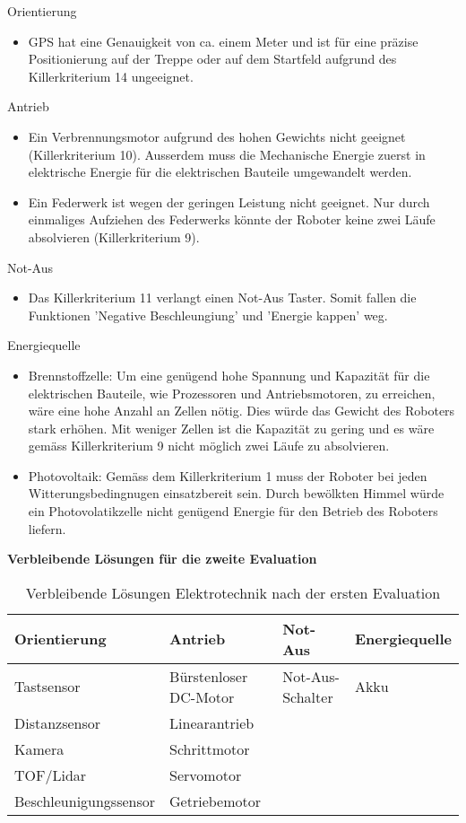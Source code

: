 Orientierung
\begin{itemize}
    \item GPS hat eine Genauigkeit von ca. einem Meter und ist für eine präzise Positionierung auf der Treppe oder auf dem Startfeld aufgrund des Killerkriterium 14 ungeeignet.
\end{itemize}
Antrieb
\begin{itemize}
    \item Ein Verbrennungsmotor aufgrund des hohen Gewichts nicht geeignet (Killerkriterium 10). Ausserdem muss die Mechanische Energie zuerst in elektrische Energie für die elektrischen Bauteile umgewandelt werden.
    \item Ein Federwerk ist wegen der geringen Leistung nicht geeignet. Nur durch einmaliges Aufziehen des Federwerks könnte der Roboter keine zwei Läufe absolvieren (Killerkriterium 9).
\end{itemize}
Not-Aus
\begin{itemize}
    \item Das Killerkriterium 11 verlangt einen Not-Aus Taster. Somit fallen die Funktionen 'Negative Beschleungiung' und 'Energie kappen' weg.
\end{itemize}
Energiequelle
\begin{itemize}
    \item Brennstoffzelle: Um eine genügend hohe Spannung und Kapazität für die elektrischen Bauteile, wie Prozessoren und Antriebsmotoren, zu erreichen, wäre eine hohe Anzahl an Zellen nötig. Dies würde das Gewicht des Roboters stark erhöhen. Mit weniger Zellen ist die Kapazität zu gering und es wäre gemäss Killerkriterium 9 nicht möglich zwei Läufe zu absolvieren.
    \item Photovoltaik: Gemäss dem Killerkriterium 1 muss der Roboter bei jeden Witterungsbedingnugen einsatzbereit sein. Durch bewölkten Himmel würde ein Photovolatikzelle nicht genügend Energie für den Betrieb des Roboters liefern.
\end{itemize}

\textbf{Verbleibende Lösungen für die zweite Evaluation}
\begin{center}
\begin{table}[h!]
    \begin{tabular}{l|l|l|l}
        \textbf{Orientierung} & \textbf{Antrieb} & \textbf{Not-Aus} & \textbf{Energiequelle} \\ 
        \hline
        Tastsensor & Bürstenloser DC-Motor & Not-Aus-Schalter & Akku\\  
        Distanzsensor & Linearantrieb &  &\\
        Kamera & Schrittmotor & &\\
        TOF/Lidar & Servomotor & &\\
        Beschleunigungssensor & Getriebemotor & & 
    \end{tabular}
    \caption{Verbleibende Lösungen Elektrotechnik nach der ersten Evaluation}
\end{table}
\end{center}


